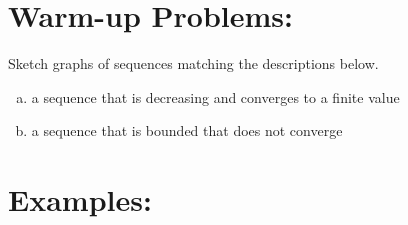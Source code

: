 

\section*{Warm-up Problems:}
Sketch graphs of sequences matching the descriptions below.

\setlength{\columnseprule}{0pt}
\begin{enumerate}[(a)]

\item a sequence that is decreasing and converges to a finite value

\item a sequence that is bounded that does not converge


\end{enumerate}

\pagebreak

\section*{Examples:}

